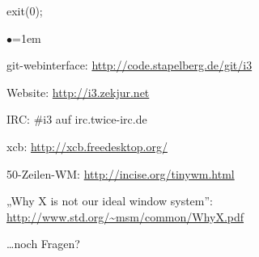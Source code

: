 \documentclass[mode=print,paper=screen,style=jefka]{powerdot}
\begin{document}
\begin{slide}{exit(0);}
\begin{list}{$\bullet$}{\itemsep=1em}
	\item git-webinterface: \url{http://code.stapelberg.de/git/i3}
	\item Website: \url{http://i3.zekjur.net}
	\item IRC: \#i3 auf irc.twice-irc.de
	\item xcb: \url{http://xcb.freedesktop.org/}
	\item 50-Zeilen-WM: \url{http://incise.org/tinywm.html}
	\item „Why X is not our ideal window system”: \url{http://www.std.org/~msm/common/WhyX.pdf}
	\item …noch Fragen?
\end{list}
\end{slide}
\end{document}
